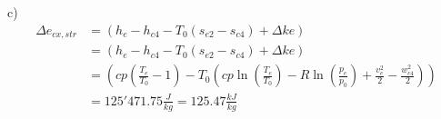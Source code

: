 c) 
\begin{align*}
\Delta e_{cx,str} &= \left( h_e - h_{c4} - T_0(s_{e2} - s_{c4}) + \Delta ke \right) \\
&= \left( h_e - h_{c4} - T_0(s_{e2} - s_{c4}) + \Delta ke \right) \\
&= \left( cp \left( \frac{T_e}{T_0} - 1 \right) - T_0 \left( cp \ln \left( \frac{T_e}{T_0} \right) - R \ln \left( \frac{p_e}{p_0} \right) + \frac{v_e^2}{2} - \frac{w_{c4}^2}{2} \right) \right) \\
&= 125'471.75 \frac{J}{kg} = 125.47 \frac{kJ}{kg}
\end{align*}